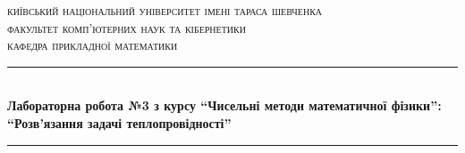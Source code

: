 
\setlength\parindent{0pt} %



\begin{titlepage}

\newcommand{\HRule}{\rule{\linewidth}{0.5mm}} %

\center %
 

\textsc{\Large київський національний університет імені тараса шевченка}\\[1.5cm] %
\textsc{\large факультет комп'ютерних наук та кібернетики}\\[0.5cm] %
\textsc{\large кафедра прикладної математики}\\[0.5cm] %


\HRule \\[0.4cm]
{ \Large \bfseries Лабораторна робота №3 з курсу “Чисельні методи математичної фізики”:}\\[0.4cm] %
{ \Large \bfseries “Розв'язання задачі теплопровідності” }
\HRule \\[1.5cm]
 


\end{titlepage}
